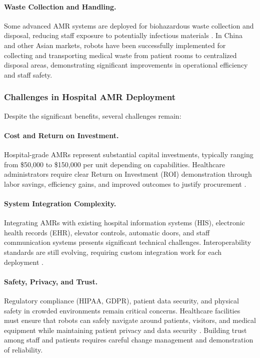 \paragraph{Waste Collection and Handling.}
Some advanced AMR systems are deployed for biohazardous waste collection and disposal, reducing staff exposure to potentially infectious materials \cite{mdpi2024}. In China and other Asian markets, robots have been successfully implemented for collecting and transporting medical waste from patient rooms to centralized disposal areas, demonstrating significant improvements in operational efficiency and staff safety.

\subsubsection{Challenges in Hospital AMR Deployment}

Despite the significant benefits, several challenges remain:

\paragraph{Cost and Return on Investment.}
Hospital-grade AMRs represent substantial capital investments, typically ranging from \$50,000 to \$150,000 per unit depending on capabilities. Healthcare administrators require clear Return on Investment (ROI) demonstration through labor savings, efficiency gains, and improved outcomes to justify procurement \cite{mdpi2024}.

\paragraph{System Integration Complexity.}
Integrating AMRs with existing hospital information systems (HIS), electronic health records (EHR), elevator controls, automatic doors, and staff communication systems presents significant technical challenges. Interoperability standards are still evolving, requiring custom integration work for each deployment \cite{frontiers2024}.

\paragraph{Safety, Privacy, and Trust.}
Regulatory compliance (HIPAA, GDPR), patient data security, and physical safety in crowded environments remain critical concerns. Healthcare facilities must ensure that robots can safely navigate around patients, visitors, and medical equipment while maintaining patient privacy and data security \cite{jmir2024}. Building trust among staff and patients requires careful change management and demonstration of reliability.

